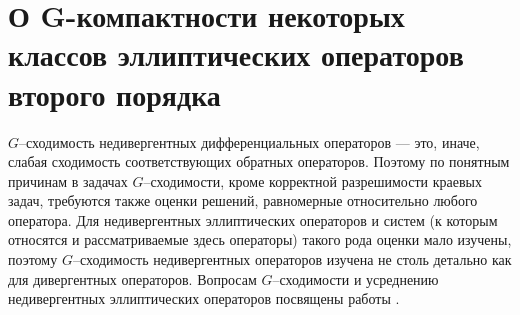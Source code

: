 

\chapter{О G-компактности некоторых классов эллиптических операторов второго порядка}

%



$G$--сходимость недивергентных дифференциальных операторов --- это, иначе, слабая сходимость
соответствующих обратных операторов. Поэтому по понятным причинам в задачах
$G$--сходимости,
кроме корректной разрешимости краевых задач, требуются также оценки решений,
равномерные относительно любого оператора. Для недивергентных эллиптических
операторов и систем (к которым относятся и рассматриваемые здесь операторы)
такого рода оценки мало изучены, поэтому $G$--сходимость
недивергентных операторов изучена не столь детально как для дивергентных операторов.
Вопросам $G$--сходимости и усреднению недивергентных эллиптических операторов
посвящены работы \cite{smm_ZhS, smm_ZhS1, smm_Sir1,smm_Sir}.

